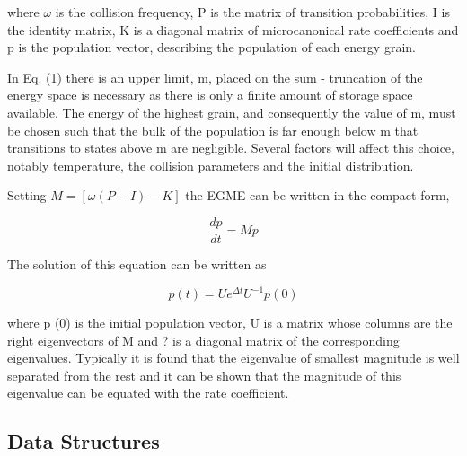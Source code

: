 where $\omega$ is the collision frequency, P is the matrix of transition probabilities, I is the identity matrix, K is a diagonal matrix of microcanonical rate coefficients and p is the population vector, describing the population of each energy grain.

In Eq. (1) there is an upper limit, m, placed on the sum - truncation of the energy space is necessary as there is only a finite amount of storage space available. The energy of the highest grain, and consequently the value of m, must be chosen such that the bulk of the population is far enough below m that transitions to states above m are negligible. Several factors will affect this choice, notably temperature, the collision parameters and the initial distribution.

Setting $M = \left[ {\omega (P - I) - K} \right]$ the EGME can be written in the compact form,

\begin{equation}
\frac{{dp}}{{dt}} = Mp
\end{equation}

The solution of this equation can be written as

\[
p(t) = Ue^{\Delta t} U^{ - 1} p(0)
\]


where p (0) is the initial population vector, U is a matrix whose columns are the right eigenvectors of M and ? is a diagonal matrix of the corresponding eigenvalues. Typically it is found that the eigenvalue of smallest magnitude is well separated from the rest and it can be shown that the magnitude of this eigenvalue can be equated with the rate coefficient.

\subsection{Data Structures
}\label{sec:DataStructures}


